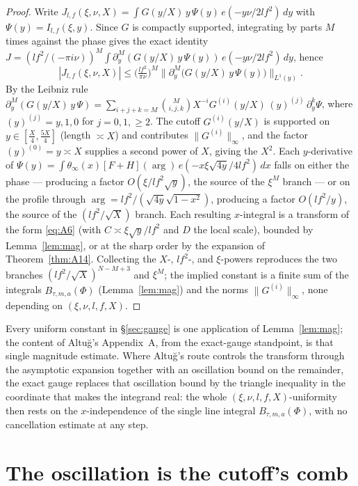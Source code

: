 \documentclass[11pt]{article}
\theoremstyle{definition}
\begin{document}
\begin{proof}
Write $J_{l,f}(\xi,\nu,X)=\int G(y/X)\,y\,\Psi(y)\,e(-y\nu/2lf^2)\,dy$ with $\Psi(y)=I_{l,f}(\xi,y)$.
Since $G$ is compactly supported, integrating by parts $M$ times against the phase gives the exact
identity $J=(lf^2/(-\pi i\nu))^M\int\partial_y^M(G(y/X)\,y\,\Psi(y))\,e(-y\nu/2lf^2)\,dy$, hence
\[
  |J_{l,f}(\xi,\nu,X)|\le\Big(\tfrac{lf^2}{\pi\nu}\Big)^{M}
    \big\|\partial_y^M\!\big(G(y/X)\,y\,\Psi(y)\big)\big\|_{L^1(y)} .
\]
By the Leibniz rule
$\partial_y^M(G(y/X)\,y\,\Psi)=\sum_{i+j+k=M}\binom{M}{i,j,k}X^{-i}G^{(i)}(y/X)\,(y)^{(j)}\,
\partial_y^k\Psi$, where $(y)^{(j)}=y,1,0$ for $j=0,1,\ge2$. The cutoff $G^{(i)}(y/X)$ is supported on
$y\in[\tfrac X4,\tfrac{5X}4]$ (length $\asymp X$) and contributes $\|G^{(i)}\|_\infty$, and the factor
$(y)^{(0)}=y\asymp X$ supplies a second power of $X$, giving the $X^2$. Each $y$-derivative of
$\Psi(y)=\int\theta_\infty(x)[F+H](\arg)\,e(-x\xi\sqrt{4y}/4lf^2)\,dx$ falls on either the phase ---
producing a factor $O(\xi/lf^2\sqrt y)$, the source of the $\xi^M$ branch --- or on the profile through
$\arg=lf^2/(\sqrt{4y}\sqrt{1-x^2})$, producing a factor $O(lf^2/y)$, the source of the $(lf^2/\sqrt
X)$ branch. Each resulting $x$-integral is a transform of the form \eqref{eq:A6} (with $C\asymp\xi\sqrt
y/lf^2$ and $D$ the local scale), bounded by Lemma~\ref{lem:mag}, or at the sharp order by the
expansion of Theorem~\ref{thm:A14}. Collecting the $X$-, $lf^2$-, and $\xi$-powers reproduces the two
branches $(lf^2/\sqrt X)^{N-M+3}$ and $\xi^M$; the implied constant is a finite sum of the integrals
$B_{\tau,m,a}(\Phi)$ (Lemma~\ref{lem:mag}) and the norms $\|G^{(i)}\|_\infty$, none depending on
$(\xi,\nu,l,f,X)$.
\end{proof}

Every uniform constant in \S\ref{sec:gauge} is one application of Lemma~\ref{lem:mag}; the content of
Altu\u{g}'s Appendix~A, from the exact-gauge standpoint, is that single magnitude estimate. Where
Altu\u{g}'s route controls the transform through the asymptotic expansion together with an oscillation
bound on the remainder, the exact gauge replaces that oscillation bound by the triangle inequality in
the coordinate that makes the integrand real: the whole $(\xi,\nu,l,f,X)$-uniformity then rests on the
$x$-independence of the single line integral $B_{\tau,m,a}(\Phi)$, with no cancellation estimate at any
step.

\section{The oscillation is the cutoff's comb}\label{sec:comb}
\end{document}
